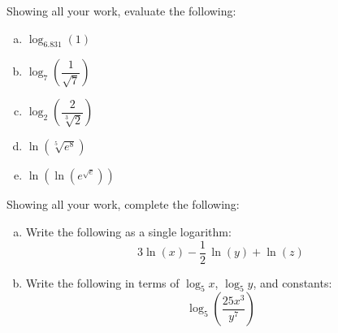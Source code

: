 \documentclass[11pt,letterpaper]{article}
\begin{document}

 Showing all your work, evaluate the following:
	\begin{enumerate}[(a)]
	\item $\log_{6.831}(1)$
	\item $\log_7 \left( \dfrac{1}{\sqrt{7}} \right)$
	\item $\log_2 \left( \dfrac{2}{\sqrt[3]{2}} \right)$
	\item $\ln(\sqrt[5]{e^8})$
	\item $\ln\left(\ln\left( e^{\sqrt{e}} \right) \right)$
	\end{enumerate}



\newpage



 Showing all your work, complete the following:
	\begin{enumerate}[(a)]
	\item Write the following as a single logarithm:
		\[
		3 \ln(x) - \dfrac{1}{2}\, \ln(y) + \ln(z)
		\]
	
	\item Write the following in terms of $\log_5 x$, $\log_5 y$, and constants:
		\[
		\log_5 \left( \dfrac{25 x^3}{y^7} \right)
		\]
	\end{enumerate}
\end{document}
